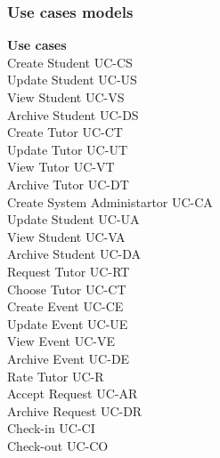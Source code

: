 \documentclass[12pt]{article}
\begin{document}
\subsubsection{Use cases models}
\textbf{Use cases}	\\		
			Create Student					UC-CS
			\\Update Student 				UC-US
			\\View Student      			UC-VS
			\\Archive Student				UC-DS
			\\Create Tutor					UC-CT
			\\Update Tutor					UC-UT
			\\View Tutor					UC-VT
			\\Archive Tutor					UC-DT
			\\Create System Administartor	UC-CA
			\\Update Student 				UC-UA
			\\View Student      			UC-VA
			\\Archive Student				UC-DA		
			\\Request Tutor					UC-RT
			\\Choose Tutor					UC-CT
			\\Create Event					UC-CE
			\\Update Event					UC-UE
			\\View Event					UC-VE
			\\Archive Event					UC-DE
			\\Rate Tutor					UC-R
			\\Accept Request				UC-AR
			\\Archive Request				UC-DR
			\\Check-in						UC-CI
			\\Check-out						UC-CO
			
\end{document}
